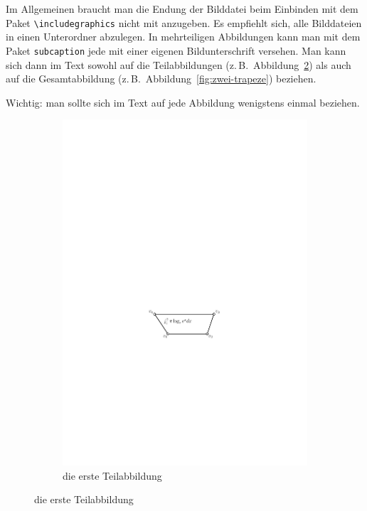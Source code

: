 \documentclass[bachelor,german]{info1thesis}
\begin{document}
Im Allgemeinen braucht man die Endung der Bilddatei beim Einbinden mit
dem Paket \verb+\includegraphics+ nicht mit anzugeben.  Es empfiehlt
sich, alle Bilddateien in einen Unterordner abzulegen.  In mehrteiligen
Abbildungen kann man mit dem Paket \verb+subcaption+ jede mit einer
eigenen Bildunterschrift versehen.  Man kann sich dann im Text sowohl
auf die Teilabbildungen (z.\,B.\ Abbildung~\ref{fig:trapez-eins}) als
auch auf die Gesamtabbildung (z.\,B.\ Abbildung~\ref{fig:zwei-trapeze})
beziehen.

Wichtig: man sollte sich im Text auf jede Abbildung wenigstens einmal
beziehen.

\begin{figure}[h]
  \begin{subfigure}{.48\textwidth}
    \centering
    \includegraphics[page=1]{abbildungen/trapez}
    \caption{die erste Teilabbildung}
    \label{fig:trapez-eins}

\end{subfigure}
\end{figure}
\end{document}
